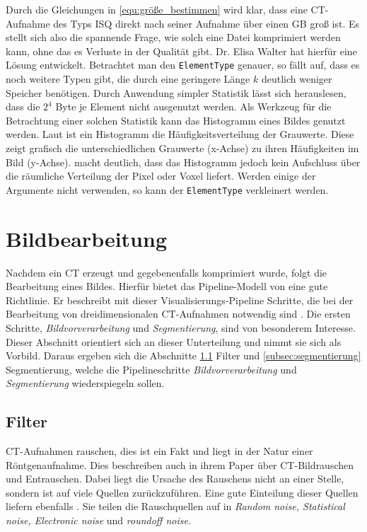 Durch die Gleichungen in \ref{equ:größe_bestimmen} wird klar, dass eine \ac{CT}-Aufnahme
des Typs \ac{ISQ} direkt nach seiner Aufnahme über einen \ac{GB} groß ist. Es
stellt sich also die spannende Frage, wie solch eine Datei komprimiert werden kann,
ohne das es Verluste in der Qualität gibt. Dr. Elisa Walter hat hierfür eine
Lösung entwickelt. Betrachtet man den \texttt{ElementType} genauer, so fällt auf,
dass es noch weitere Typen gibt, die durch eine geringere Länge $k$ deutlich weniger
Speicher benötigen. Durch Anwendung simpler Statistik lässt sich herauslesen, dass
die $2^{4}$ Byte je Element nicht ausgenutzt werden. Als Werkzeug für die
Betrachtung einer solchen Statistik kann das Histogramm eines Bildes genutzt
werden. Laut \citet[S.~249]{jahne2024} ist ein Histogramm die
Häufigkeitsverteilung der Grauwerte. Diese zeigt grafisch die unterschiedlichen Grauwerte
(x-Achse) zu ihren Häufigkeiten im Bild (y-Achse). \citet[S.~249]{jahne2024} macht
deutlich, dass das Histogramm jedoch kein Aufschluss über die räumliche
Verteilung der Pixel oder Voxel liefert. Werden einige der Argumente nicht verwenden,
so kann der \texttt{ElementType} verkleinert werden.

\section{Bildbearbeitung}
\label{sec:bildbearbeitung} Nachdem ein \ac{CT} erzeugt und gegebenenfalls
komprimiert wurde, folgt die Bearbeitung eines Bildes. Hierfür bietet das
Pipeline-Modell von \citet[S.~50]{handels2000} eine gute Richtlinie. Er
beschreibt mit dieser Visualisierungs-Pipeline Schritte, die bei der Bearbeitung
von dreidimensionalen \ac{CT}-Aufnahmen notwendig sind \citep[vgl.][S.~50]{handels2000}.
Die ersten Schritte, \textit{Bildvorverarbeitung} und \textit{Segmentierung},
sind von besonderem Interesse. Dieser Abschnitt orientiert sich an dieser Unterteilung
und nimmt sie sich als Vorbild. Daraus ergeben sich die Abschnitte
\ref{subsec:filter} Filter und \ref{subsec:segmentierung} Segmentierung, welche die
Pipelineschritte \textit{Bildvorverarbeitung} und \textit{Segmentierung} wiederspiegeln
sollen.

\subsection{Filter}
\label{subsec:filter} \ac{CT}-Aufnahmen rauschen, dies ist ein Fakt und liegt in
der Natur einer Röntgenaufnahme. Dies beschreiben auch \citet[K.~3]{diwakar2018}
in ihrem Paper über \ac{CT}-Bildrauschen und Entrauschen. Dabei liegt die Ursache
des Rauschens nicht an einer Stelle, sondern ist auf viele Quellen
zurückzuführen. Eine gute Einteilung dieser Quellen liefern ebenfalls \citet[K.~3]{diwakar2018}.
Sie teilen die Rauschquellen auf in \textit{Random noise, Statistical noise,
Electronic noise} und \textit{roundoff noise}.

